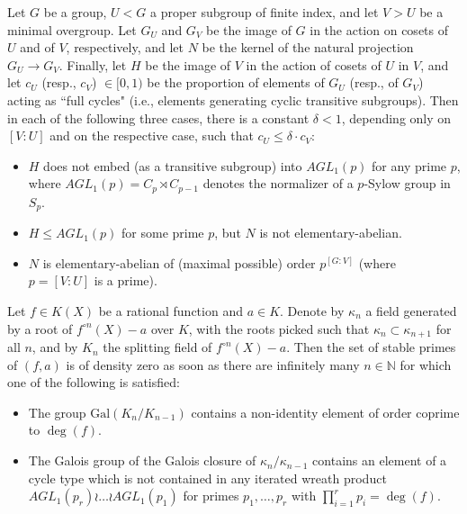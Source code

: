 \documentclass[10pt,a4paper]{amsart}
\begin{document}
  \begin{proposition}
  \label{prop:stabpr_gp}
  Let $G$ be a group, $U<G$ a proper subgroup of finite index, and let $V>U$ be a minimal overgroup. Let $G_U$ and $G_V$ be the image of $G$ in the action on cosets of $U$ and of $V$,  respectively, and let $N$ be the kernel of the natural projection $G_U\to G_V$. Finally, let $H$ be the image of $V$ in the action of cosets of $U$ in $V$, and let $c_U$ (resp., $c_V$) $\in [0,1)$ be the proportion of elements of $G_U$ (resp., of $G_V$) acting as ``full cycles" (i.e., elements generating cyclic transitive subgroups). Then in each of the following three cases, there is a constant $\delta<1$, depending only on $[V:U]$ and on the respective case, such that $c_U \le \delta \cdot c_V$:
  \begin{itemize}
  \item[a)] $H$ does not embed (as a transitive subgroup) into $AGL_1(p)$ for any prime $p$, where $AGL_1(p)=C_p\rtimes C_{p-1}$ denotes the normalizer of a $p$-Sylow group in $S_p$.
  \item[b)] $H\le AGL_1(p)$ for some prime $p$, but $N$ is not elementary-abelian.
  \item[c)] $N$ is elementary-abelian of (maximal possible) order $p^{[G:V]}$ (where $p=[V:U]$ is a prime).
  \end{itemize}
  \end{proposition}

    \begin{corollary}
  \label{cor:stabpr}
  Let $f\in K(X)$ be a rational function  and $a\in K$. Denote by $\kappa_n$ a field generated by a root of $f^{\circ n}(X)-a$ over $K$, with the roots picked such that $\kappa_n\subset \kappa_{n+1}$ for all $n$, and by $K_n$ the splitting field of $f^{\circ n}(X)-a$. Then the set of stable primes of $(f,a)$ is of density zero as soon as there are infinitely many $n\in \mathbb{N}$ for which one of the following is satisfied:
  \begin{itemize}
 \item[a)]
 The group $\mathrm{Gal}(K_n/K_{n-1})$ contains a non-identity element of order coprime to $\deg(f)$.
 \item[b)] The Galois group of the Galois closure of $\kappa_n/\kappa_{n-1}$ contains an element of a cycle type which is not contained in any iterated wreath product $AGL_1(p_r)\wr\dots \wr AGL_1(p_1)$ for primes $p_1,\dots, p_r$ with $\prod_{i=1}^r p_i=\deg(f)$.
  \end{itemize}
  \end{corollary}
\end{document}
